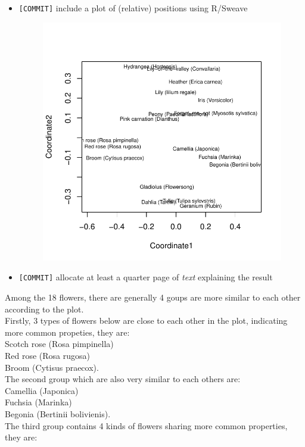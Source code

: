 \documentclass[12pt]{article}
\begin{document}
\begin{itemize}
    \item \verb+[COMMIT]+ include a plot of (relative) positions using R/Sweave
    \begin{figure}[h]
      \centering
\includegraphics{ywu67HW3-015}
    \end{figure}
\pagebreak
    \item \verb+[COMMIT]+ allocate at least a quarter page of \emph{text} explaining the result
\end{itemize}
Among the 18 flowers, there are generally 4 goups are more similar to each other according to the plot.\\
Firstly, 3 types of flowers below are close to each other in the plot, indicating more common propeties, they are:\\
Scotch rose (Rosa pimpinella)\\
Red rose (Rosa rugosa)\\
Broom (Cytisus praecox).\\
The second group which are also very similar to each others are:\\
Camellia (Japonica)\\
Fuchsia (Marinka)\\
Begonia (Bertinii bolivienis).\\
The third group contains 4 kinds of flowers sharing more common properties, they are:\\
\end{document}
